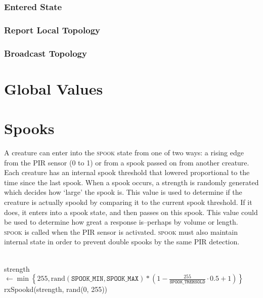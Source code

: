 \documentclass{article}
\newcommand{\code}{\texttt}
\newcommand{\rand}{\text{rand}}
\begin{document}
\subsubsection{Entered State}
\subsubsection{Report Local Topology}
\subsubsection{Broadcast Topology}

\clearpage
\section{Global Values}

\clearpage
\section{Spooks}
A creature can enter into the \textsc{spook} state from one of two ways: a rising edge from the PIR sensor (0 to 1) or from a spook passed on from another creature. 
Each creature has an internal spook threshold that lowered proportional to the time since the last spook.
When a spook occurs, a strength is randomly generated which decides how `large' the spook is.
This value is used to determine if the creature is actually spookd by comparing it to the current spook threshold. If it does, it enters into a spook state, and then passes on this spook.
This value could be used to determine how great a response is--perhaps by volume or length.\\

\textsc{spook} is called when the PIR sensor is activated. \textsc{spook} must also maintain internal state in order to prevent double spooks by the same PIR detection.
\begin{algorithm}
    \begin{algorithmic}[1]
        \\
            \qquad strength $\longleftarrow \min\left\{255, \rand(\code{SPOOK\_MIN},  \code{SPOOK\_MAX}) * \left(1 - \frac{255}{\code{SPOOK\_TREHSOLD}} \cdot 0.5 + 1\right)\right\}$\\
            \qquad rxSpookd(strength, rand(0, 255))
        \EndFunction
    \end{algorithmic}
\end{algorithm}
\end{document}
